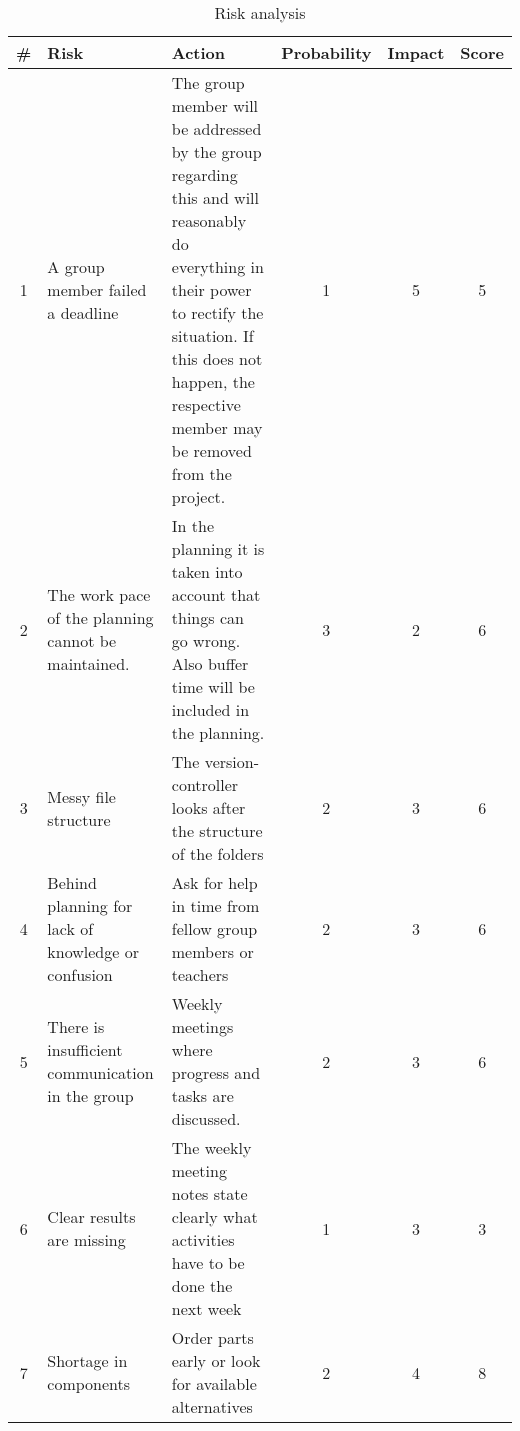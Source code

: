 \renewcommand\tabularxcolumn[1]{m{#1}}%

\begin{table}[!h]
	\begin{tabularx}{\textwidth}{|c|X|X|c|c|c|} \hline
		\# 	& Risk 													& Action 																				& Probability 	& Impact 	& Score 	\\ \hline
		1 	& A group member failed a deadline			            & The group member will be addressed by the group regarding this and will reasonably do everything in their power to rectify the situation. If this does not happen, the respective member may be removed from the project.							   & 1 & 5			& \cellcolor{yellow}5	\\ \hline
		2 	& The work pace of the planning cannot be maintained. 	& In the planning it is taken into account that things can go wrong. Also buffer time will be included in the planning.																																		      & 3 & 2		 & \cellcolor{yellow}6	\\ \hline
		3 	& Messy file structure									& The version-controller looks after the structure of the folders						& 2	& 3			& \cellcolor{yellow}6	\\ \hline
		4 	& Behind planning for lack of knowledge or confusion	& Ask for help in time from fellow group members or teachers							& 2	& 3			& \cellcolor{yellow}6	\\ \hline
		5 	& There is insufficient communication in the group		& Weekly meetings where progress and tasks are discussed.								& 2	& 3			& \cellcolor{yellow}6	\\ \hline
		6 	& Clear results are missing								& The weekly meeting notes state clearly what activities have to be done the next week	& 1	& 3			& \cellcolor{green}3	\\ \hline
		7 	& Shortage in components								& Order parts early or look for available alternatives									& 2	& 4			& \cellcolor{yellow}8	\\ \hline
	\end{tabularx}
	\caption{Risk analysis}
	\label{tab:risk_analysis}
\end{table}